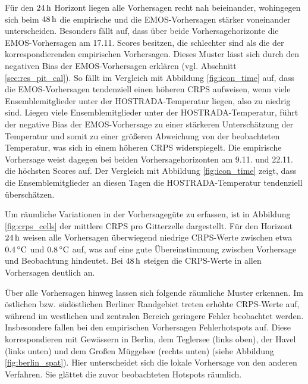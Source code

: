 Für den $24\,\mathrm{h}$ Horizont liegen alle Vorhersagen recht nah beieinander, wohingegen sich beim $48\,\mathrm{h}$ die empirische und die EMOS-Vorhersagen stärker voneinander unterscheiden. Besonders fällt auf, dass über beide Vorhersagehorizonte die EMOS-Vorhersagen am 17.11. Scores besitzen, die schlechter sind als die der korrespondierenden empirischen Vorhersagen. Dieses Muster lässt sich durch den negativen Bias der EMOS-Vorhersagen erklären (vgl. Abschnitt \ref{sec:res_pit_cal}). So fällt im Vergleich mit Abbildung \ref{fig:icon_time} auf, dass die EMOS-Vorhersagen tendenziell einen höheren CRPS aufweisen, wenn viele Ensemblemitglieder unter der HOSTRADA-Temperatur liegen, also zu niedrig sind. Liegen viele Ensemblemitglieder unter der HOSTRADA-Temperatur, führt der negative Bias der EMOS-Vorhersage zu einer stärkeren Unterschätzung der Temperatur und somit zu einer größeren Abweichung von der beobachteten Temperatur, was sich in einem höheren CRPS widerspiegelt. Die empirische Vorhersage weist dagegen bei beiden Vorhersagehorizonten am 9.11. und 22.11. die höchsten Scores auf. Der Vergleich mit Abbildung \ref{fig:icon_time} zeigt, dass die Ensemblemitglieder an diesen Tagen die HOSTRADA-Temperatur tendenziell überschätzen.

Um räumliche Variationen in der Vorhersagegüte zu erfassen, ist in Abbildung \ref{fig:crps_cells} der mittlere CRPS pro Gitterzelle dargestellt. Für den Horizont $24\,\mathrm{h}$ weisen alle Vorhersagen überwiegend niedrige CRPS-Werte zwischen etwa $0.4\,^\circ\mathrm{C}$ und $0.8\,^\circ\mathrm{C}$ auf, was auf eine gute Übereinstimmung zwischen Vorhersage und Beobachtung hindeutet. Bei $48\,\mathrm{h}$ steigen die CRPS-Werte in allen Vorhersagen deutlich an.

Über alle Vorhersagen hinweg lassen sich folgende räumliche Muster erkennen. Im östlichen bzw. südöstlichen Berliner Randgebiet treten erhöhte CRPS-Werte auf, während im westlichen und zentralen Bereich geringere Fehler beobachtet werden. Insbesondere fallen bei den empirischen Vorhersagen Fehlerhotspots auf. Diese korrespondieren mit Gewässern in Berlin, dem Teglersee (links oben), der Havel (links unten) und dem Großen Müggelsee (rechts unten) (siehe Abbildung \ref{fig:berlin_spat}). Hier unterscheidet sich die lokale Vorhersage von den anderen Verfahren. Sie glättet die zuvor beobachteten Hotspots räumlich.

